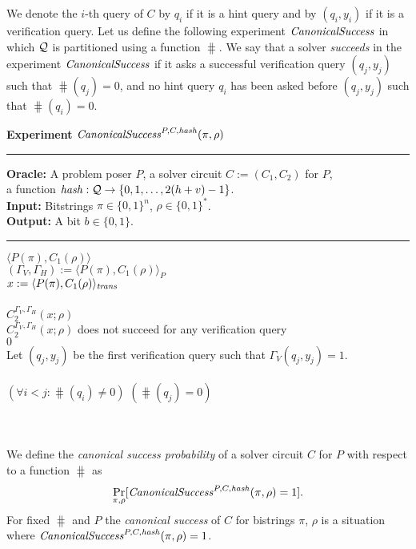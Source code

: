 We denote the $i$-th query of $C$ by $q_i$ if it is a hint query and by $(q_i, y_i)$ if it is a verification query.
Let us define the following experiment $\operatorname{\mathit{CanonicalSuccess}}$ in which $\mathcal{Q}$ is partitioned using a function $\hash$.
We say that a solver \textit{succeeds} in the experiment $\operatorname{\mathit{CanonicalSuccess}}$
if it asks a successful verification query $(q_j, y_j)$ such that $\hash(q_j) = 0$,
and no hint query $q_i$ has been asked before $(q_j, y_j)$ such that $\hash(q_i) = 0$.
%
\begin{codeblock}
  \textbf{Experiment} $\operatorname{\mathit{CanonicalSuccess}}^{P, C, \operatorname{\mathit{hash}}}(\pi, \rho)$
  \medskip \hrule
  \textbf{Oracle:} A problem poser $P$, a solver circuit $C := (C_1, C_2)$ for $P$,\\
  \IndII a function $\operatorname{\mathit{hash}}: \mathcal{Q} \rightarrow \{0, 1, \dotsc, 2(h+v) - 1\}$.\\
  \textbf{Input:}  Bitstrings $\pi \in \{0,1\}^n$, $\rho \in \{0,1\}^*$. \\
  \textbf{Output:} A bit $b \in \{0,1\}$.
  \medskip\hrule
  \Run $\langle P(\pi), C_1(\rho) \rangle$ \\
  \IndI $(\Gamma_V, \Gamma_H) := \langle P(\pi), C_1(\rho) \rangle_{P}$ \\
  \IndI $x := \langle P(\pi), C_1(\rho) \rangle_{\operatorname{\mathit{trans}}}$ \\ \\
  \Run $C_2^{\Gamma_V, \Gamma_H} (x; \rho)$ \\
  \IndI \If $C_2^{\Gamma_V, \Gamma_H} (x; \rho)$ does not succeed for any verification query \Then \\
  \IndII \Return $0$ \\
  \IndI Let $(q_j,y_j)$ be the first verification query such that $\Gamma_V(q_j, y_j) = 1$.\\
  \\
  \If $(\forall i < j :  \hash(q_i) \neq 0)$ \And $(\hash(q_j) = 0)$ \Then \\
  \IndI {}\\
  \Else\\
  \IndI {}
\end{codeblock}
%
We define the \textit{canonical success probability} of a solver circuit $C$ for $P$ with respect to a function $\hash$ as
\begin{align}
 \underset{\pi, \rho}{\Pr}[\operatorname{\mathit{CanonicalSuccess}}^{P, C, \operatorname{\mathit{hash}}}(\pi, \rho) = 1].
\end{align}
%
For fixed $\hash$ and $P$ the \textit{canonical success} of $C$ for bistrings $\pi$, $\rho$ is a situation where
$\operatorname{\mathit{CanonicalSuccess}}^{P, C, \operatorname{\mathit{hash}}}(\pi, \rho) = 1$.

